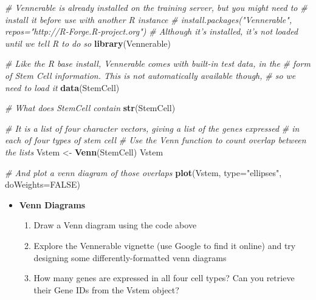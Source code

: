 \documentclass[a4paper]{book}
\newenvironment{Shaded}{\begin{snugshade}}{\end{snugshade}}
\newcommand{\KeywordTok}[1]{\textcolor[rgb]{0.13,0.29,0.53}{\textbf{{#1}}}}
\newcommand{\DataTypeTok}[1]{\textcolor[rgb]{0.13,0.29,0.53}{{#1}}}
\newcommand{\StringTok}[1]{\textcolor[rgb]{0.31,0.60,0.02}{{#1}}}
\newcommand{\CommentTok}[1]{\textcolor[rgb]{0.56,0.35,0.01}{\textit{{#1}}}}
\newcommand{\OtherTok}[1]{\textcolor[rgb]{0.56,0.35,0.01}{{#1}}}
\newcommand{\NormalTok}[1]{{#1}}
\providecommand{\tightlist}{%
  \setlength{\itemsep}{0pt}\setlength{\parskip}{0pt}}
\renewenvironment{Shaded}
{\vspace{1.5em}\begin{leftbar}\begin{snugshade}}
{\end{snugshade}\end{leftbar}\vspace{3pt}}
\newenvironment{rmdblock}[1]
  {\vspace{1.5em}\begin{shaded*}
  \begin{itemize}
  \renewcommand{\labelitemi}{
    \raisebox{-.7\height}[0pt][0pt]{
      {\setkeys{Gin}{width=3em,keepaspectratio}\texttt{[image: images/\#1]}}
    }
  }
  \item
  }
  {
  \end{itemize}
  \end{shaded*}
  }
\newenvironment{rmdexercise}
  {\begin{rmdblock}{exercise}}
  {\end{rmdblock}}
\begin{document}
\begin{Shaded}
\begin{Highlighting}[]
\CommentTok{# Vennerable is already installed on the training server, but you might need to}
\CommentTok{# install it before use with another R instance}
\CommentTok{# install.packages("Vennerable", repos="http://R-Forge.R-project.org")}
\CommentTok{# Although it's installed, it's not loaded until we tell R to do so}
\KeywordTok{library}\NormalTok{(Vennerable)}

\CommentTok{# Like the R base install, Vennerable comes with built-in test data, in the}
\CommentTok{# form of Stem Cell information. This is not automatically available though,}
\CommentTok{# so we need to load it}
\KeywordTok{data}\NormalTok{(StemCell)}

\CommentTok{# What does StemCell contain}
\KeywordTok{str}\NormalTok{(StemCell)}
\end{Highlighting}
\end{Shaded}

\begin{Shaded}
\begin{Highlighting}[]
\CommentTok{# It is a list of four character vectors, giving a list of the genes expressed}
\CommentTok{# in each of four types of stem cell}
\CommentTok{# Use the Venn function to count overlap between the lists}
\NormalTok{Vstem <-}\StringTok{ }\KeywordTok{Venn}\NormalTok{(StemCell)}
\NormalTok{Vstem}
\end{Highlighting}
\end{Shaded}

\begin{Shaded}
\begin{Highlighting}[]
\CommentTok{# And plot a venn diagram of those overlaps}
\KeywordTok{plot}\NormalTok{(Vstem, }\DataTypeTok{type=}\StringTok{"ellipses"}\NormalTok{, }\DataTypeTok{doWeights=}\OtherTok{FALSE}\NormalTok{)}
\end{Highlighting}
\end{Shaded}

\begin{rmdexercise}
\textbf{Venn Diagrams}

\begin{enumerate}
\def\labelenumi{\arabic{enumi}.}
\tightlist
\item
  Draw a Venn diagram using the code above
\item
  Explore the Vennerable vignette (use Google to find it online) and try
  designing some differently-formatted venn diagrams
\item
  How many genes are expressed in all four cell types? Can you retrieve
  their Gene IDs from the Vstem object?
\end{enumerate}
\end{rmdexercise}
\end{document}
